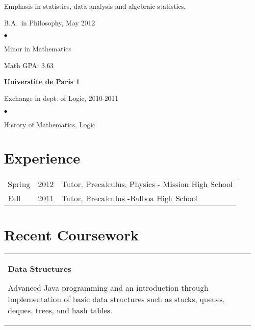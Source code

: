 \documentclass[margin,line,pifont,palatino,courier]{res}
\newenvironment{list1}{
  \begin{list}{\ding{113}}{%
      \setlength{\itemsep}{0in}
      \setlength{\parsep}{0in} \setlength{\parskip}{0in}
      \setlength{\topsep}{0in} \setlength{\partopsep}{0in}
      \setlength{\leftmargin}{0.17in}}}{\end{list}}
\newenvironment{list2}{
  \begin{list}{$\bullet$}{%
      \setlength{\itemsep}{0in}
      \setlength{\parsep}{0in} \setlength{\parskip}{0in}
      \setlength{\topsep}{0in} \setlength{\partopsep}{0in}
      \setlength{\leftmargin}{0.2in}}}{\end{list}}
\begin{document}
\begin{resume}
\begin{list1}
Emphasis in statistics, data analysis and algebraic statistics. 

\item B.A.~in Philosophy, May 2012

\begin{list2}
\vspace*{.05in}
\item Minor in Mathematics 
\item Math GPA: 3.63
\end{list2}

\end{list1}

{\bf Universtite de Paris 1}\\
\vspace*{-.1in}
\begin{list1}
\item[]Exchange in dept. of Logic, 2010-2011

\begin{list2}
\vspace*{.05in}
\item History of Mathematics, Logic
\end{list2}

\end{list1}





\section{\sc Experience}

\begin{tabular}{@{}p{0.4in}p{0.3in}p{4in}}
Spring & 2012 & Tutor, Precalculus, Physics - Mission High School\\
Fall & 2011 &  Tutor, Precalculus  -Balboa High School\\

\end{tabular}


\section{\sc Recent Coursework}

\begin{tabular}{@{}p{5in}p{3in}}
\begin{list1}
\item \textbf{Data Structures}  

	Advanced Java programming and an introduction through implementation of basic data structures such as stacks, queues, deques, trees, and hash tables.  
	

\end{list1}
\end{tabular}
\end{resume}
\end{document}
